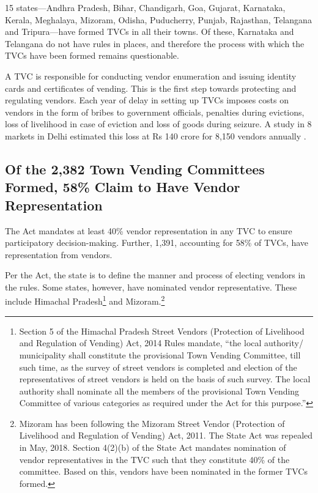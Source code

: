\documentclass[a4paper, 12pt, twoside]{article}
\begin{document}
	15 states—Andhra Pradesh, Bihar, Chandigarh, Goa, Gujarat, Karnataka, Kerala, Meghalaya, Mizoram, Odisha, Puducherry, Punjab, Rajasthan, Telangana and Tripura—have formed TVCs in all their towns. Of these, Karnataka and Telangana do not have rules in places, and therefore the process with which the TVCs have been formed remains questionable.

	A TVC is responsible for conducting vendor enumeration and issuing identity cards and certificates of vending. This is the first step towards protecting and regulating vendors. Each year of delay in setting up TVCs imposes costs on vendors in the form of bribes to government officials, penalties during evictions, loss of livelihood in case of eviction and loss of goods during seizure. A study in 8 markets in Delhi estimated this loss at Rs 140 crore for 8,150 vendors annually \parencite{rattanpaper}.

\subsection*{Of the 2,382 Town Vending Committees Formed, 58\% Claim to Have Vendor Representation}
	The Act mandates at least 40\% vendor representation in any TVC to ensure participatory decision-making. Further, 1,391, accounting for 58\% of TVCs, have representation from vendors.

	Per the Act, the state is to define the manner and process of electing vendors in the rules. Some states, however, have nominated vendor representative. These include Himachal Pradesh\footnote{Section 5 of the Himachal Pradesh Street Vendors (Protection of Livelihood and Regulation of Vending) Act, 2014 Rules mandate, “the local authority/ municipality shall constitute the provisional Town Vending Committee, till such time, as the survey of street vendors is completed and election of the representatives of street vendors is held on the basis of such survey. The local authority shall nominate all the members of the provisional Town Vending Committee of various categories as required under the Act for this purpose.”} and Mizoram.\footnote{Mizoram has been following the Mizoram Street Vendor (Protection of Livelihood and Regulation of Vending) Act, 2011. The State Act was repealed in May, 2018. Section 4(2)(b) of the State Act mandates nomination of vendor representatives in the TVC such that they constitute 40\% of the committee. Based on this, vendors have been nominated in the former TVCs formed.}
\end{document}
